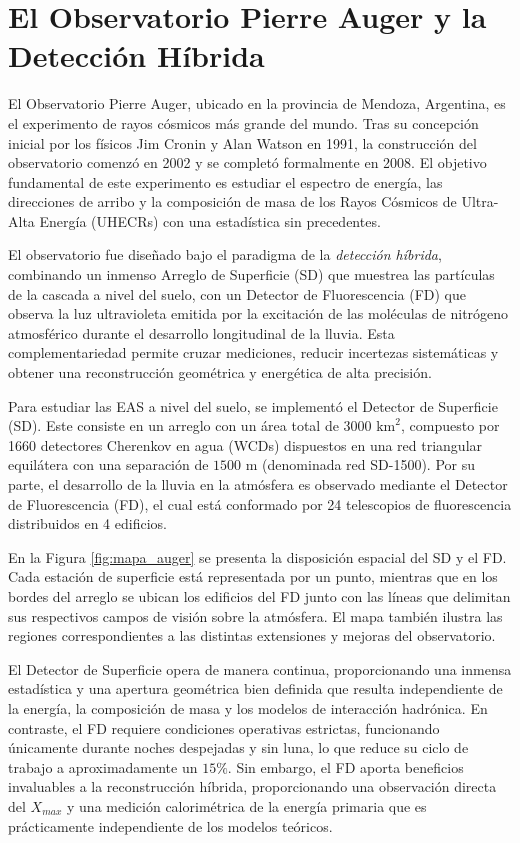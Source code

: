 
\chapter{El Observatorio Pierre Auger y la Detección Híbrida}
\label{sec:observatorio}

El Observatorio Pierre Auger, ubicado en la provincia de Mendoza, Argentina, es el experimento de rayos cósmicos más grande del mundo. Tras su concepción inicial por los físicos Jim Cronin y Alan Watson en 1991, la construcción del observatorio comenzó en 2002 y se completó formalmente en 2008. El objetivo fundamental de este experimento es estudiar el espectro de energía, las direcciones de arribo y la composición de masa de los Rayos Cósmicos de Ultra-Alta Energía (UHECRs) con una estadística sin precedentes.

El observatorio fue diseñado bajo el paradigma de la \textit{detección híbrida}, combinando un inmenso Arreglo de Superficie (SD) que muestrea las partículas de la cascada a nivel del suelo, con un Detector de Fluorescencia (FD) que observa la luz ultravioleta emitida por la excitación de las moléculas de nitrógeno atmosférico durante el desarrollo longitudinal de la lluvia. Esta complementariedad permite cruzar mediciones, reducir incertezas sistemáticas y obtener una reconstrucción geométrica y energética de alta precisión. 

Para estudiar las EAS a nivel del suelo, se implementó el Detector de Superficie (SD). Este consiste en un arreglo con un área total de $3000\text{ km}^2$, compuesto por 1660 detectores Cherenkov en agua (WCDs) dispuestos en una red triangular equilátera con una separación de $1500\text{ m}$ (denominada red SD-1500). Por su parte, el desarrollo de la lluvia en la atmósfera es observado mediante el Detector de Fluorescencia (FD), el cual está conformado por 24 telescopios de fluorescencia distribuidos en 4 edificios. 

En la Figura \ref{fig:mapa_auger} se presenta la disposición espacial del SD y el FD. Cada estación de superficie está representada por un punto, mientras que en los bordes del arreglo se ubican los edificios del FD junto con las líneas que delimitan sus respectivos campos de visión sobre la atmósfera. El mapa también ilustra las regiones correspondientes a las distintas extensiones y mejoras del observatorio.

El Detector de Superficie opera de manera continua, proporcionando una inmensa estadística y una apertura geométrica bien definida que resulta independiente de la energía, la composición de masa y los modelos de interacción hadrónica. En contraste, el FD requiere condiciones operativas estrictas, funcionando únicamente durante noches despejadas y sin luna, lo que reduce su ciclo de trabajo a aproximadamente un $15\%$. Sin embargo, el FD aporta beneficios invaluables a la reconstrucción híbrida, proporcionando una observación directa del $X_{max}$ y una medición calorimétrica de la energía primaria que es prácticamente independiente de los modelos teóricos.

